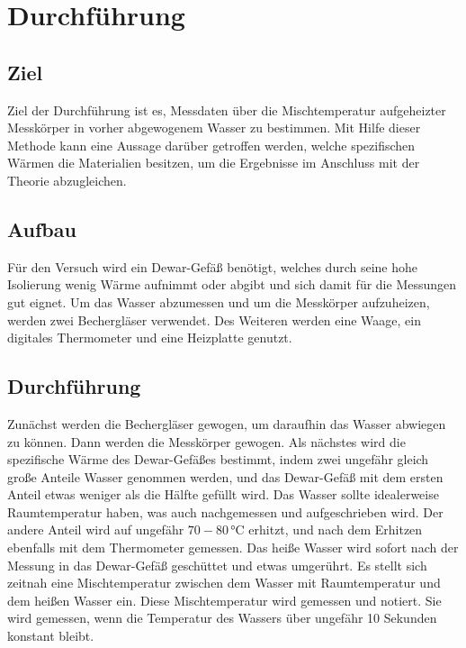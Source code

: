 \section{Durchführung}
\label{sec:Durchführung}
\subsection{Ziel}
Ziel der Durchführung ist es, Messdaten über die Mischtemperatur aufgeheizter Messkörper in vorher abgewogenem Wasser zu bestimmen.
Mit Hilfe dieser Methode kann eine Aussage darüber getroffen werden, welche spezifischen Wärmen die Materialien besitzen, um die Ergebnisse im Anschluss mit der Theorie abzugleichen. %

\subsection{Aufbau}
Für den Versuch wird ein Dewar-Gefäß benötigt, welches durch seine hohe Isolierung wenig Wärme aufnimmt oder abgibt und sich damit für die Messungen gut eignet. %
Um das Wasser abzumessen und um die Messkörper aufzuheizen, werden zwei Bechergläser verwendet.
Des Weiteren werden eine Waage, ein digitales Thermometer und eine Heizplatte genutzt.

\subsection{Durchführung}
Zunächst werden die Bechergläser gewogen, um daraufhin das Wasser abwiegen zu können. Dann werden die Messkörper gewogen.
Als nächstes wird die spezifische Wärme des Dewar-Gefäßes bestimmt, indem zwei ungefähr gleich große Anteile Wasser genommen werden, und das Dewar-Gefäß %
mit dem ersten Anteil etwas weniger als die Hälfte gefüllt wird. Das Wasser sollte idealerweise Raumtemperatur haben, was auch nachgemessen und aufgeschrieben wird.
Der andere Anteil wird auf ungefähr $70-80 \, \si{\celsius}$ erhitzt, und nach dem Erhitzen ebenfalls mit dem Thermometer gemessen. %
Das heiße Wasser wird sofort nach der Messung in das Dewar-Gefäß geschüttet und etwas umgerührt.
Es stellt sich zeitnah eine Mischtemperatur zwischen dem Wasser mit Raumtemperatur und dem heißen Wasser ein.
Diese Mischtemperatur wird gemessen und notiert. Sie wird gemessen, wenn die Temperatur des Wassers über ungefähr 10 Sekunden konstant bleibt.

